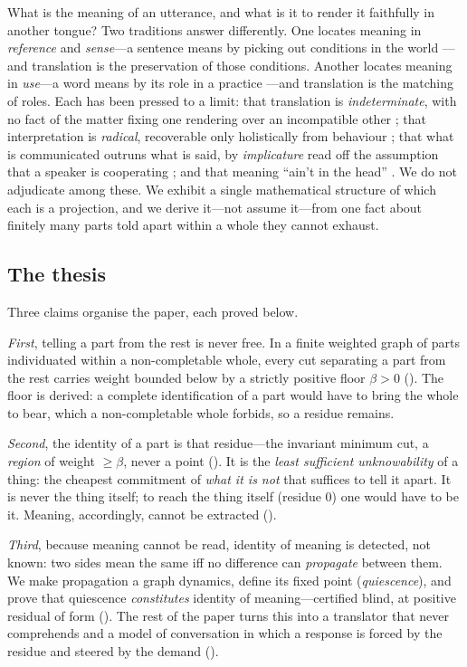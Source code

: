 \documentclass[twocolumn,11pt,a4paper]{article}
\theoremstyle{sup}
\theoremstyle{definition}
\theoremstyle{remark}
\newcommand{\flo}{\beta}
\begin{document}
What is the meaning of an utterance, and what is it to render it faithfully in
another tongue? Two traditions answer differently. One locates meaning in
\emph{reference} and \emph{sense}---a sentence means by picking out conditions
in the world \citep{frege1892}---and translation is the preservation of those
conditions. Another locates meaning in \emph{use}---a word means by its role in
a practice \citep{wittgenstein1953}---and translation is the matching of roles.
Each has been pressed to a limit: that translation is \emph{indeterminate}, with
no fact of the matter fixing one rendering over an incompatible other
\citep{quine1960}; that interpretation is \emph{radical}, recoverable only
holistically from behaviour \citep{davidson1973}; that what is communicated
outruns what is said, by \emph{implicature} read off the assumption that a
speaker is cooperating \citep{grice1975,sperberwilson1986}; and that meaning
``ain't in the head'' \citep{putnam1975}. We do not adjudicate among these. We
exhibit a single mathematical structure of which each is a projection, and we
derive it---not assume it---from one fact about finitely many parts told apart
within a whole they cannot exhaust.

\subsection{The thesis}

Three claims organise the paper, each proved below.

\emph{First}, telling a part from the rest is never free. In a finite weighted
graph of parts individuated within a non-completable whole, every cut separating
a part from the rest carries weight bounded below by a strictly positive floor
$\flo>0$ (). The floor is derived: a complete identification of
a part would have to bring the whole to bear, which a non-completable whole
forbids, so a residue remains.

\emph{Second}, the identity of a part is that residue---the invariant minimum
cut, a \emph{region} of weight $\ge\flo$, never a point (). It
is the \emph{least sufficient unknowability} of a thing: the cheapest commitment
of \emph{what it is not} that suffices to tell it apart. It is never the thing
itself; to reach the thing itself (residue $0$) one would have to be it.
Meaning, accordingly, cannot be extracted ().

\emph{Third}, because meaning cannot be read, identity of meaning is detected,
not known: two sides mean the same iff no difference can \emph{propagate}
between them. We make propagation a graph dynamics, define its fixed point
(\emph{quiescence}), and prove that quiescence \emph{constitutes} identity of
meaning---certified blind, at positive residual of form
(). The rest of the paper turns this into a translator
that never comprehends and a model of conversation in which a response is forced
by the residue and steered by the demand ().
\end{document}
